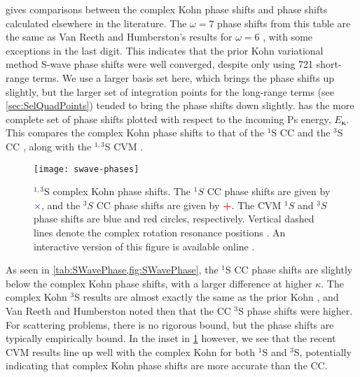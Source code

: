 \documentclass[Dissertation.tex]{subfiles}
\begin{document}
 gives comparisons between the complex Kohn phase 
shifts and phase shifts calculated elsewhere in the literature. The $\omega = 
7$ phase shifts from this table are the same as Van Reeth and 
Humberston's results for $\omega = 6$ \cite{VanReeth2003}, with some 
exceptions in the last digit. This indicates that the prior Kohn variational 
method S-wave phase shifts were well converged, despite only using 721
short-range terms. 
We use a larger basis set here, which brings the phase shifts up slightly,
but the larger set of integration points for the long-range terms (see
\cref{sec:SelQuadPoints}) tended to bring the phase shifts down slightly.
 has the more complete set of phase shifts plotted with 
respect to the incoming Ps energy, $E_{\bm \kappa}$. This compares the 
complex Kohn phase shifts to that of the $^1$S CC \cite{Walters2004} and the $
^3$S CC \cite{Blackwood2002}, along with the $^{1,3}$S CVM \cite{Zhang2012}. 

\begin{figure}
	\centering
	\texttt{[image: swave-phases]}
	\caption[$^{1,3}$S phase shifts]{$^{1,3}$S complex Kohn phase shifts. The $^1S$ CC phase shifts
\cite{Walters2004} are given by \mbox{\textcolor{blue}{$\times$}}, and the
$^3S$ CC phase shifts \cite{Blackwood2002} are given by
\mbox{\textcolor{red}{\textbf{+}}}. The CVM $^1S$ and $^3S$ phase shifts
\cite{Zhang2012} are blue and red circles,
respectively. Vertical dashed lines denote the complex rotation resonance
positions \cite{Yan1999,Yan1998a,Ho1998}. An interactive version of this
figure is available online \cite{Plotly}.}
	\label{fig:SWavePhase}
\end{figure}

As seen in \cref{tab:SWavePhase,fig:SWavePhase}, the $^1$S CC phase 
shifts are slightly below the complex Kohn phase shifts, with a larger 
difference at higher $\kappa$. The complex Kohn $^3$S results are almost 
exactly the same as the prior Kohn \cite{VanReeth2003}, and Van Reeth and 
Humberston noted then that the CC $^3$S phase shifts were higher. For 
scattering problems, there is no rigorous bound, but the phase shifts are
typically empirically bound. In the inset in
\cref{fig:SWavePhase} however, we see that the recent CVM results line up 
well with the complex Kohn for both $^1$S and $^3$S, potentially indicating 
that complex Kohn phase shifts are more accurate than the CC.
\end{document}
